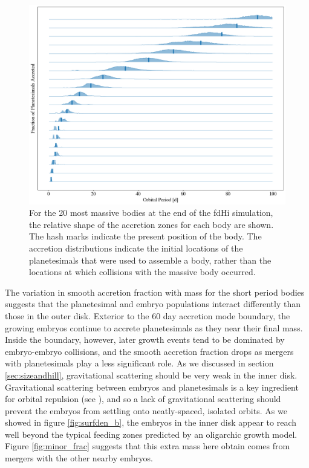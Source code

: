 \documentclass[twocolumn]{aastex63}
\begin{document}
\begin{figure}
\begin{center}
    \includegraphics[width=\textwidth]{figures/acc_zones.png}
    \caption{For the 20 most massive bodies at the end of the fdHi simulation, the relative shape of the accretion zones for each body are shown. The hash marks indicate the present position of the body. The accretion distributions indicate the initial locations of the planetesimals that were used to assemble a body, rather than the locations at which collisions with the massive body occurred.\label{fig:acc_zones}}
\end{center}
\end{figure}

The variation in smooth accretion fraction with mass for the short period bodies suggests that the planetesimal and embryo populations interact differently than those in the outer disk. Exterior to the 60 day accretion mode boundary, the growing embryos continue to accrete planetesimals as they near their final mass. Inside the boundary, however, later growth events tend to be dominated by embryo-embryo collisions, and the smooth accretion fraction drops as mergers with planetesimals play a less significant role. As we discussed in section \ref{sec:sizeandhill}, gravitational scattering should be very weak in the inner disk. Gravitational scattering between embryos and planetesimals is a key ingredient for orbital repulsion (see \citet{kokubo98}), and so a lack of gravitational scattering should prevent the embryos from settling onto neatly-spaced, isolated orbits. As we showed in figure \ref{fig:surfden_b}, the embryos in the inner disk appear to reach well beyond the typical feeding zones predicted by an oligarchic growth model. Figure \ref{fig:minor_frac} suggests that this extra mass here obtain comes from mergers with the other nearby embryos.
\end{document}
